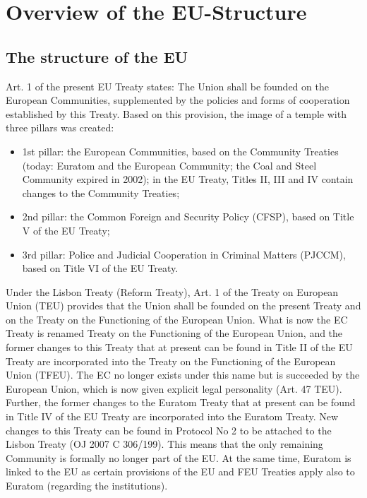 \section{Overview of the EU-Structure}
\label{sec:EU-Structure}

\subsection{The structure of the EU}
Art. 1 of the present EU Treaty states: \set{\ldots} The Union shall be founded on the European Communities, supplemented by the policies and forms of cooperation established by this Treaty. \set{\ldots} Based on this provision, the image of a temple with three pillars was created:

\begin{itemize}
\item 1st pillar: the European Communities, based on the Community Treaties (today: Euratom and the European Community; the Coal and Steel Community expired in 2002); in the EU Treaty, Titles II, III and IV contain changes to the Community Treaties;
\item 2nd pillar: the Common Foreign and Security Policy (CFSP), based on Title V of the EU Treaty;
\item 3rd pillar: Police and Judicial Cooperation in Criminal Matters (PJCCM), based on Title VI of the
EU Treaty.
\end{itemize}

Under the Lisbon Treaty (Reform Treaty), Art. 1 of the Treaty on European Union (TEU) provides that the Union shall be founded on the present Treaty and on the Treaty on the Functioning of the European Union. What is now the EC Treaty is renamed Treaty on the Functioning of the European Union, and the former changes to this Treaty that at present can be found in Title II of the EU Treaty are incorporated into the Treaty on the Functioning of the European Union (TFEU). The EC no longer exists under this name but is succeeded by the European Union, which is now given explicit legal personality (Art. 47 TEU).
Further, the former changes to the Euratom Treaty that at present can be found in Title IV of the EU Treaty are incorporated into the Euratom Treaty. New changes to this Treaty can be found in Protocol No 2 to be attached to the Lisbon Treaty (OJ 2007 C 306/199). This means that the only remaining Community is formally no longer part of the EU. At the same time, Euratom is linked to the EU as certain provisions of the EU and FEU Treaties apply also to Euratom (\eg regarding the institutions).

